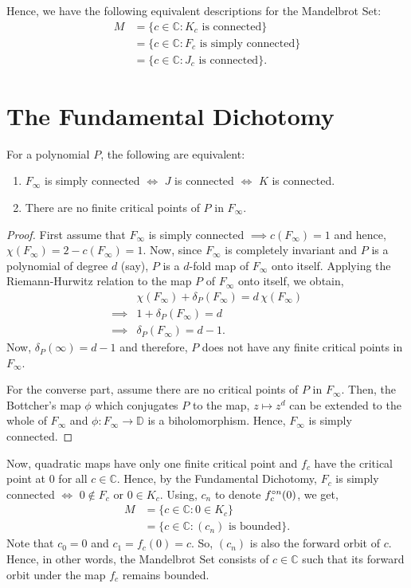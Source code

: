 \noindent Hence, we have the following equivalent descriptions for the Mandelbrot Set:
\begin{align*}
	M &=\{c\in \mathbb{C}:K_c \text{ is connected}\}\\
	  &=\{c\in \mathbb{C}:F_c \text{ is simply connected}\}\\
	  &=\{c\in \mathbb{C}:J_c \text{ is connected}\}
.\end{align*}

\section{The Fundamental Dichotomy}
\begin{theorem}
	For a polynomial \( P \), the following are equivalent:
	\begin{enumerate}
		\item \( F_\infty \) is simply connected \( \iff \) \( J \) is connected \( \iff \) \( K \) is connected.
		\item There are no finite critical points of \( P \) in \( F_\infty \).
	\end{enumerate}
\end{theorem}
\begin{proof}
	First assume that \( F_\infty \) is simply connected \( \implies c(F_\infty)=1 \) and hence, \( \chi(F_\infty)=2-c(F_\infty)=1 \).
	Now, since \( F_\infty \) is completely invariant and \( P \) is a polynomial of degree \( d \) (say), \( P \) is a \( d \)-fold
	map of \( F_\infty \) onto itself.
	Applying the Riemann-Hurwitz relation to the map \( P \) of \( F_\infty \) onto itself, we obtain,
	\begin{align*}
		&\chi(F_\infty)+\delta_P(F_\infty)=d\,\chi(F_\infty)\\
		\implies & 1+\delta_P(F_\infty)=d\\
		\implies & \delta_P(F_\infty)=d-1
	.\end{align*}
	Now, \( \delta_P(\infty)=d-1 \) and therefore, \( P \) does not have any finite critical points in \( F_\infty \).

	For the converse part, assume there are no critical points of \( P \) in \( F_\infty \). Then, the Bottcher's map \( \phi \) which
	conjugates \( P \) to the map, \( z\mapsto z^d \) can be extended to the whole of \( F_\infty \) and \( \phi:F_\infty\to \mathbb{D} \)
	is a biholomorphism. Hence, \( F_\infty \) is simply connected.
\end{proof}

Now, quadratic maps have only one finite critical point and \( f_c \) have the critical point at \( 0 \) for all \( c\in \mathbb{C} \).
Hence, by the Fundamental Dichotomy, \( F_c \) is simply connected \( \iff \) \( 0\not\in F_c \) or \( 0\in K_c \). Using, \( c_n \) to denote \( \fcof[n](0) \),
we get,
\begin{align*}
	M&=\{c\in \mathbb{C}:0\in K_c\}\\
	 &=\{c\in \mathbb{C}:(c_n)\text{ is bounded}\}
.\end{align*}
Note that \( c_0=0 \) and \( c_1=f_c(0)=c \). So, \( (c_n) \) is also the forward orbit of \( c \). Hence, in other words,
the Mandelbrot Set consists of \( c\in \mathbb{C} \) such that its forward orbit under the map \( f_c \)
remains bounded.

